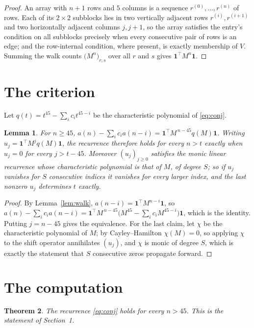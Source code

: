 \documentclass[11pt,a4paper]{article}
\theoremstyle{plain}
\newtheorem{theorem}{Theorem}
\newtheorem{lemma}[theorem]{Lemma}
\theoremstyle{definition}
\begin{document}
\begin{proof}
An array with $n+1$ rows and $5$ columns is a sequence $r^{(0)},\dots,r^{(n)}$ of
rows. Each of its $2\times2$ subblocks lies in two vertically adjacent rows
$r^{(i)},r^{(i+1)}$ and two horizontally adjacent columns $j,j+1$, so the array satisfies
the entry's condition on all subblocks precisely when every consecutive pair of rows is an
edge; and the row-internal condition, where present, is exactly membership of $V$. Summing
the walk counts $\bigl(M^{n}\bigr)_{r,s}$ over all $r$ and $s$ gives
$\mathbf{1}^{\!\top}M^{n}\mathbf{1}$.
\end{proof}

\section{The criterion}

Let $q(t)=t^{45}-\sum_i c_i t^{45-i}$ be the characteristic polynomial of
\eqref{eq:conj}.

\begin{lemma}\label{lem:crit}
For $n\ge45$,
$a(n)-\sum_i c_i a(n-i)=\mathbf{1}^{\!\top}M^{\,n-45}q(M)\mathbf{1}$. Writing
$u_j=\mathbf{1}^{\!\top}M^{j}q(M)\mathbf{1}$, the recurrence therefore holds for every
$n>t$ exactly when $u_j=0$ for every $j>t-45$. Moreover $(u_j)_{j\ge0}$ satisfies the
monic linear recurrence whose characteristic polynomial is that of $M$, of degree $S$; so
if $u_j$ vanishes for $S$ consecutive indices it vanishes for every larger index, and the
last nonzero $u_j$ determines $t$ exactly.
\end{lemma}

\begin{proof}
By Lemma~\ref{lem:walk}, $a(n-i)=\mathbf{1}^{\!\top}M^{n-i}\mathbf{1}$, so
$a(n)-\sum_i c_i a(n-i)
=\mathbf{1}^{\!\top}M^{\,n-45}\bigl(M^{45}-\sum_i c_i M^{45-i}\bigr)
\mathbf{1}$, which is the identity. Putting $j=n-45$ gives the equivalence. For the
last claim, let $\chi$ be the characteristic polynomial of $M$; by Cayley--Hamilton
$\chi(M)=0$, so applying $\chi$ to the shift operator annihilates $(u_j)$, and $\chi$ is
monic of degree $S$, which is exactly the statement that $S$ consecutive zeros propagate
forward.
\end{proof}

\section{The computation}

\begin{theorem}
The recurrence \eqref{eq:conj} holds for every $n>45$. This is the statement of
Section~1.
\end{theorem}
\end{document}
